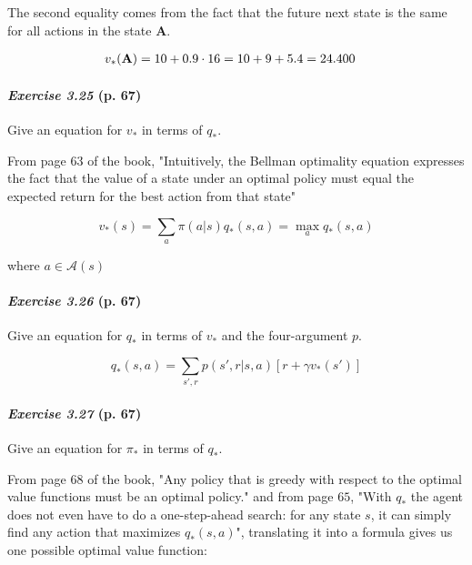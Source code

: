 \documentclass[10pt,a4paper]{article}
\begin{document}
The second equality comes from the fact that the future next state is the same for all actions in the state \textbf{A}.

\begin{equation}
\begin{split}
v_*(\textrm{\textbf{A}}) &= 10 + 0.9 \cdot 16 = 10 + 9 + 5.4 = 24.400
\end{split}
\end{equation}


\paragraph{\textit{Exercise 3.25} (p. 67)} Give an equation for $v_*$ in terms of $q_*$.

\bigskip
From page $63$ of the book, "Intuitively, the Bellman optimality equation expresses the
fact that the value of a state under an optimal policy must equal the expected return for
the best action from that state"

\begin{equation}
v_*(s) = \sum_{a} \pi(a \lvert s) q_*(s, a) = \max_{a} q_*(s, a)
\end{equation}

where $a \in \mathcal{A}(s)$

\paragraph{\textit{Exercise 3.26} (p. 67)} Give an equation for $q_*$ in terms of $v_*$ and the four-argument $p$.

\bigskip
\begin{equation}
q_*(s, a) = \sum_{s', r} p(s', r \lvert s, a) \left[r + \gamma v_*(s')\right]
\end{equation}

\paragraph{\textit{Exercise 3.27} (p. 67)} Give an equation for $\pi_*$ in terms of $q_*$.

\bigskip

From page $68$ of the book, "Any policy that is greedy with respect to the optimal value functions must be an optimal
policy." and from page $65$, "With $q_*$ the agent does not
even have to do a one-step-ahead search: for any state $s$, it can simply find any action
that maximizes $q_*(s, a)$", translating it into a formula gives us one possible optimal value function:
\end{document}
